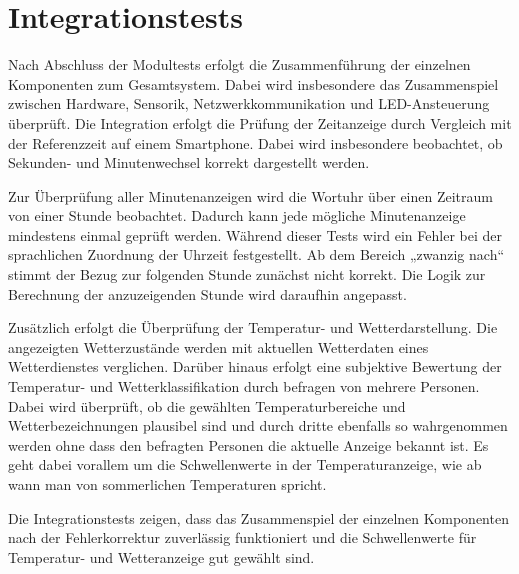 \section{Integrationstests} 
Nach Abschluss der Modultests erfolgt die Zusammenführung der einzelnen Komponenten zum Gesamtsystem.  
Dabei wird insbesondere das Zusammenspiel zwischen Hardware, Sensorik, Netzwerkkommunikation und LED-Ansteuerung überprüft.  
Die Integration erfolgt die Prüfung der Zeitanzeige durch Vergleich mit der Referenzzeit auf einem Smartphone.  
Dabei wird insbesondere beobachtet, ob Sekunden- und Minutenwechsel korrekt dargestellt werden.  

Zur Überprüfung aller Minutenanzeigen wird die Wortuhr über einen Zeitraum von einer Stunde beobachtet.  
Dadurch kann jede mögliche Minutenanzeige mindestens einmal geprüft werden.  
Während dieser Tests wird ein Fehler bei der sprachlichen Zuordnung der Uhrzeit festgestellt.  
Ab dem Bereich „zwanzig nach“ stimmt der Bezug zur folgenden Stunde zunächst nicht korrekt.  
Die Logik zur Berechnung der anzuzeigenden Stunde wird daraufhin angepasst.  

Zusätzlich erfolgt die Überprüfung der Temperatur- und Wetterdarstellung.  
Die angezeigten Wetterzustände werden mit aktuellen Wetterdaten eines Wetterdienstes verglichen.  
Darüber hinaus erfolgt eine subjektive Bewertung der Temperatur- und Wetterklassifikation durch befragen von mehrere Personen.  
Dabei wird überprüft, ob die gewählten Temperaturbereiche und Wetterbezeichnungen plausibel sind und durch dritte ebenfalls so wahrgenommen werden ohne dass den befragten Personen die aktuelle Anzeige bekannt ist.
Es geht dabei vorallem um die Schwellenwerte in der Temperaturanzeige, wie ab wann man von sommerlichen Temperaturen spricht.  

Die Integrationstests zeigen, dass das Zusammenspiel der einzelnen Komponenten nach der Fehlerkorrektur zuverlässig funktioniert und die Schwellenwerte für Temperatur- und Wetteranzeige gut gewählt sind.